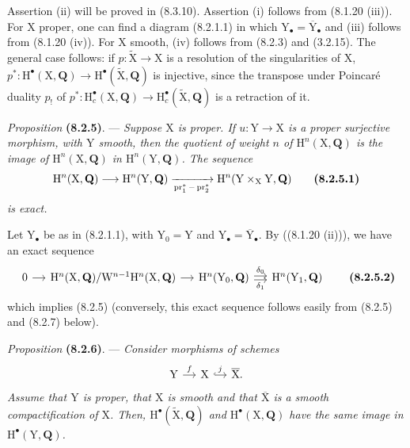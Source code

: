 \documentclass[11pt,leqno]{article}
\begin{document}
Assertion (ii) will be proved in (8.3.10). Assertion (i) follows from (8.1.20 (iii)). For \(\mathrm{X}\) proper, one can find a diagram (8.2.1.1) in which \(\mathrm{Y}_\bullet=\overline{\mathrm{Y}}_\bullet\) and (iii) follows from (8.1.20 (iv)). For \(\mathrm{X}\) smooth, (iv) follows from (8.2.3) and (3.2.15). The general case follows: if \(p:\widetilde{\mathrm{X}}\to\mathrm{X}\) is a resolution of the singularities of \(\mathrm{X}\), \(p^*:\mathrm{H}^\bullet(\mathrm{X},\mathbf{Q})\to\mathrm{H}^\bullet(\widetilde{\mathrm{X}},\mathbf{Q})\) is injective, since the transpose under Poincaré duality \(p_!\) of \(p^*:\mathrm{H}_c^\bullet(\mathrm{X},\mathbf{Q})\to\mathrm{H}_c^\bullet(\widetilde{\mathrm{X}},\mathbf{Q})\) is a retraction of it.

\textit{Proposition} \textbf{(8.2.5)}. — \textit{Suppose \(\mathrm{X}\) is proper. If \(u:\mathrm{Y}\to\mathrm{X}\) is a proper surjective morphism, with \(\mathrm{Y}\) smooth, then the quotient of weight \(n\) of \(\mathrm{H}^n(\mathrm{X},\mathbf{Q})\) is the image of \(\mathrm{H}^n(\mathrm{X},\mathbf{Q})\) in \(\mathrm{H}^n(\mathrm{Y},\mathbf{Q})\). The sequence}
\[
\mathrm{H}^n(\mathrm{X},\mathbf{Q})
\longrightarrow
\mathrm{H}^n(\mathrm{Y},\mathbf{Q})
\xrightarrow[\operatorname{pr}_1^*-\operatorname{pr}_2^*]{}
\mathrm{H}^n(\mathrm{Y}\times_{\mathrm{X}}\mathrm{Y},\mathbf{Q})
\tag*{\textbf{(8.2.5.1)}}
\]
\textit{is exact.}

Let \(\mathrm{Y}_\bullet\) be as in (8.2.1.1), with \(\mathrm{Y}_0=\mathrm{Y}\) and \(\mathrm{Y}_\bullet=\overline{\mathrm{Y}}_\bullet\). By ((8.1.20 (ii))), we have an exact sequence
\[
\begin{tikzcd}[column sep=small]
0 \arrow[r]
 & \mathrm{H}^n(\mathrm{X},\mathbf{Q})/
   \mathrm{W}^{n-1}\mathrm{H}^n(\mathrm{X},\mathbf{Q}) \arrow[r]
 & \mathrm{H}^n(\mathrm{Y}_0,\mathbf{Q})
   \arrow[r,shift left=.4ex,"\delta_0"]
   \arrow[r,shift right=.4ex,"\delta_1"']
 & \mathrm{H}^n(\mathrm{Y}_1,\mathbf{Q})
\end{tikzcd}
\tag*{\textbf{(8.2.5.2)}}
\]
which implies (8.2.5) (conversely, this exact sequence follows easily from (8.2.5) and (8.2.7) below).

\textit{Proposition} \textbf{(8.2.6)}. — \textit{Consider morphisms of schemes}
\[
\begin{tikzcd}[column sep=small]
\mathrm{Y} \arrow[r,"f"]
 & \mathrm{X} \arrow[r,hook,"j"]
 & \overline{\mathrm{X}}.
\end{tikzcd}
\]
\textit{Assume that \(\mathrm{Y}\) is proper, that \(\mathrm{X}\) is smooth and that \(\overline{\mathrm{X}}\) is a smooth compactification of \(\mathrm{X}\). Then, \(\mathrm{H}^\bullet(\widetilde{\mathrm{X}},\mathbf{Q})\) and \(\mathrm{H}^\bullet(\mathrm{X},\mathbf{Q})\) have the same image in \(\mathrm{H}^\bullet(\mathrm{Y},\mathbf{Q})\).}
\end{document}

